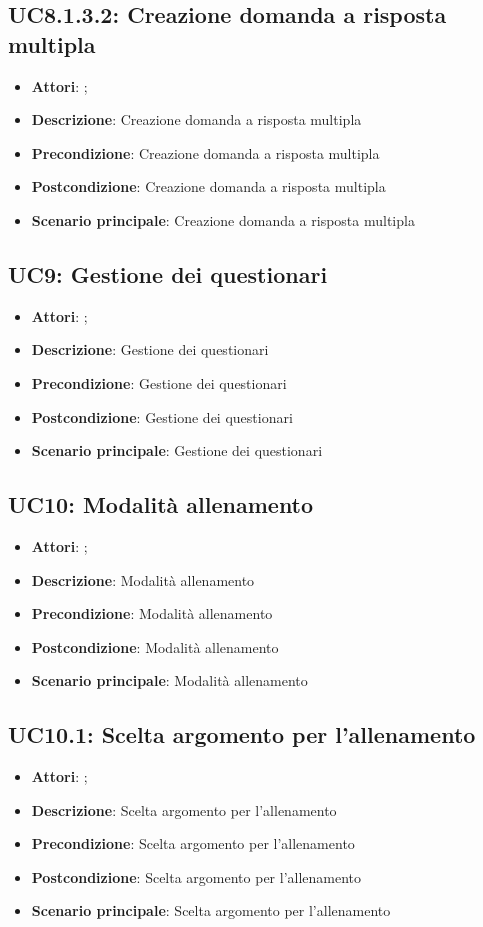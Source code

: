 \subsection{UC8.1.3.2: Creazione domanda a risposta multipla}
\label{UC8.1.3.2}
\begin{itemize}
\item \textbf{Attori}: ;
\item \textbf{Descrizione}: Creazione domanda a risposta multipla
\item \textbf{Precondizione}: Creazione domanda a risposta multipla
\item \textbf{Postcondizione}: Creazione domanda a risposta multipla
\item \textbf{Scenario principale}:
Creazione domanda a risposta multipla
\end{itemize}

\subsection{UC9: Gestione dei questionari}
\label{UC9}
\begin{itemize}
\item \textbf{Attori}: ;
\item \textbf{Descrizione}: Gestione dei questionari
\item \textbf{Precondizione}: Gestione dei questionari
\item \textbf{Postcondizione}: Gestione dei questionari
\item \textbf{Scenario principale}:
Gestione dei questionari
\end{itemize}

\subsection{UC10: Modalità allenamento}
\label{UC10}
\begin{itemize}
\item \textbf{Attori}: ;
\item \textbf{Descrizione}: Modalità allenamento
\item \textbf{Precondizione}: Modalità allenamento
\item \textbf{Postcondizione}: Modalità allenamento
\item \textbf{Scenario principale}:
Modalità allenamento
\end{itemize}

\subsection{UC10.1: Scelta argomento per l'allenamento}
\label{UC10.1}
\begin{itemize}
\item \textbf{Attori}: ;
\item \textbf{Descrizione}: Scelta argomento per l'allenamento
\item \textbf{Precondizione}: Scelta argomento per l'allenamento
\item \textbf{Postcondizione}: Scelta argomento per l'allenamento
\item \textbf{Scenario principale}:
Scelta argomento per l'allenamento
\end{itemize}

